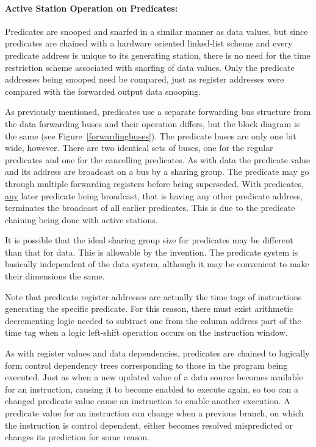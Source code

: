 \documentclass[10pt,dvips]{article}
\begin{document}
\paragraph{Active Station Operation on Predicates: }
Predicates are snooped and snarfed in a similar manner as data values,
but since predicates are chained with a hardware oriented linked-list
scheme and every predicate address is unique to its generating station,
there is no need for the time restriction scheme associated
with snarfing of data values.  Only the predicate addresses being
snooped need be compared, just as register addresses were compared with the
forwarded output data snooping.

As previously mentioned, predicates use a separate forwarding bus
structure from the data forwarding buses and their operation differs,
but the block diagram is the same (see Figure~\ref{forwardingbuses}).
The predicate buses are only one bit wide, however. There are two identical
sets of buses, one
for the regular predicates and one for the cancelling predicates.
As with data the predicate value and its address are broadcast on a bus
by a sharing group. The predicate may go through multiple forwarding
registers before being superseded. With predicates, \underline{any}
later predicate being broadcast, that is having any other predicate
address, terminates the broadcast of all earlier predicates. This
is due to the predicate chaining being done with active stations.

It is possible that the ideal sharing group size for predicates may be
different than that for data. This is allowable by the invention.
The predicate system is basically independent of the data system,
although it may be convenient to make their dimensions the same.

Note that predicate register addresses are actually the
time tags of instructions generating the specific predicate.
For this reason, there must exist
arithmetic decrementing logic needed to subtract one from the
column address part of the time tag when a logic left-shift
operation occurs on the instruction window.

As with register values and data dependencies, predicates are chained to
logically
form control dependency trees corresponding to those
in the program being executed.
Just as when a new updated value of a data source becomes
available for an instruction, causing it to become enabled to
execute again, so too can a changed predicate value cause
an instruction to enable another execution.  A predicate
value for an instruction can change when a previous branch,
on which the instruction is control dependent, either becomes
resolved mispredicted or changes its prediction for some reason.
\end{document}
